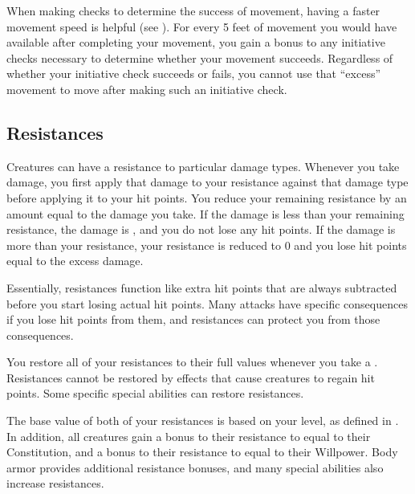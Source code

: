         \label{Movement-Based Initiative}
        When making  checks to determine the success of movement, having a faster movement speed is helpful (see ).
        For every 5 feet of movement you would have available after completing your movement, you gain a  bonus to any initiative checks necessary to determine whether your movement succeeds.
        Regardless of whether your initiative check succeeds or fails, you cannot use that ``excess'' movement to move after making such an initiative check.

    \subsection{Resistances}\label{Resistances}
        Creatures can have a resistance to particular damage types.
        Whenever you take damage, you first apply that damage to your resistance against that damage type before applying it to your hit points.
        You reduce your remaining resistance by an amount equal to the damage you take.
        If the damage is less than your remaining resistance, the damage is , and you do not lose any hit points.
        If the damage is more than your resistance, your resistance is reduced to 0 and you lose hit points equal to the excess damage.

        Essentially, resistances function like extra hit points that are always subtracted before you start losing actual hit points.
        Many attacks have specific consequences if you lose hit points from them, and resistances can protect you from those consequences.

        You restore all of your resistances to their full values whenever you take a .
        Resistances cannot be restored by effects that cause creatures to regain hit points.
        Some specific special abilities can restore resistances.

        The base value of both of your resistances is based on your level, as defined in .
        In addition, all creatures gain a bonus to their resistance to  equal to their Constitution, and a bonus to their resistance to  equal to their Willpower.
        Body armor provides additional resistance bonuses, and many special abilities also increase resistances.

